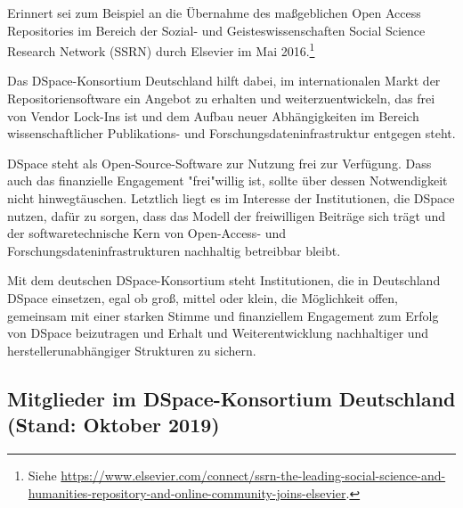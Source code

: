 \documentclass[a4paper,
fontsize=11pt,
oneside,
numbers=noperiodatend,
parskip=half-,
bibliography=totoc,
final
]{scrartcl}
\begin{document}
Erinnert sei zum Beispiel an die Übernahme des maßgeblichen Open Access
Repositories im Bereich der Sozial- und Geisteswissenschaften Social
Science Research Network (SSRN) durch Elsevier im Mai 2016.\footnote{Siehe
  \url{https://www.elsevier.com/connect/ssrn-the-leading-social-science-and-humanities-repository-and-online-community-joins-elsevier}.}

Das DSpace-Konsortium Deutschland hilft dabei, im internationalen Markt
der Repositoriensoftware ein Angebot zu erhalten und weiterzuentwickeln,
das frei von Vendor Lock-Ins ist und dem Aufbau neuer Abhängigkeiten im
Bereich wissenschaftlicher Publikations- und
Forschungsdateninfrastruktur entgegen steht.

DSpace steht als Open-Source-Software zur Nutzung frei zur Verfügung.
Dass auch das finanzielle Engagement "frei"willig ist, sollte über
dessen Notwendigkeit nicht hinwegtäuschen. Letztlich liegt es im
Interesse der Institutionen, die DSpace nutzen, dafür zu sorgen, dass
das Modell der freiwilligen Beiträge sich trägt und der
softwaretechnische Kern von Open-Access- und
Forschungsdateninfrastrukturen nachhaltig betreibbar bleibt.

Mit dem deutschen DSpace-Konsortium steht Institutionen, die in
Deutschland DSpace einsetzen, egal ob groß, mittel oder klein, die
Möglichkeit offen, gemeinsam mit einer starken Stimme und finanziellem
Engagement zum Erfolg von DSpace beizutragen und Erhalt und
Weiterentwicklung nachhaltiger und herstellerunabhängiger Strukturen zu
sichern.

\hypertarget{mitglieder-im-dspace-konsortium-deutschland-stand-oktober-2019}{%
\subsection{Mitglieder im DSpace-Konsortium Deutschland (Stand: Oktober
2019)}\label{mitglieder-im-dspace-konsortium-deutschland-stand-oktober-2019}}
\end{document}
